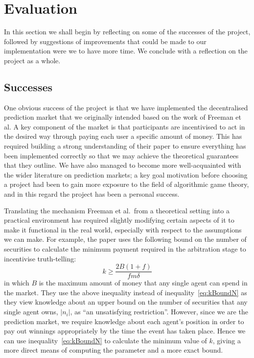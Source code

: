 \section{Evaluation}

\label{sec:evaluation}

In this section we shall begin by reflecting on some of the successes of the
project, followed by suggestions of improvements that could be made to our
implementation were we to have more time. We conclude with a reflection on the
project as a whole.

\subsection{Successes}

One obvious success of the project is that we have implemented the
decentralised prediction market that we originally intended based on the work
of Freeman et al. A key component of the market is that participants are
incentivised to act in the desired way through paying each user a specific
amount of money. This has required building a strong understanding of their
paper to ensure everything has been implemented correctly so that we may
achieve the theoretical guarantees that they outline.  We have also managed to
become more well-acquainted with the wider literature on prediction markets; a
key goal motivation before choosing a project had been to gain more exposure to
the field of algorithmic game theory, and in this regard the project has been a
personal success.

Translating the mechanism Freeman et al.\ from a theoretical setting into a
practical environment has required slightly modifying certain aspects of it to
make it functional in the real world, especially with respect to the
assumptions we can make. For example, the paper uses the following bound on the
number of securities to calculate the minimum payment required in the
arbitration stage to incentivise truth-telling:
%
\begin{equation}
	\label{eq:kBoundB}
	k \ge \frac{2 B (1+f)}{f m \delta}
\end{equation}
%
in which $B$ is the maximum amount of money that any single agent can spend in
the market. They use the above inequality instead of
inequality~\eqref{eq:kBoundN} as they view knowledge about an upper bound on
the number of securities that any single agent owns, $|n_i|$, as ``an
unsatisfying restriction''. However, since we are the prediction market, we
require knowledge about each agent's position in order to pay out winnings
appropriately by the time the event has taken place.  Hence we can use
inequality~\eqref{eq:kBoundN} to calculate the minimum value of $k$, giving a
more direct means of computing the parameter and a more exact bound.

